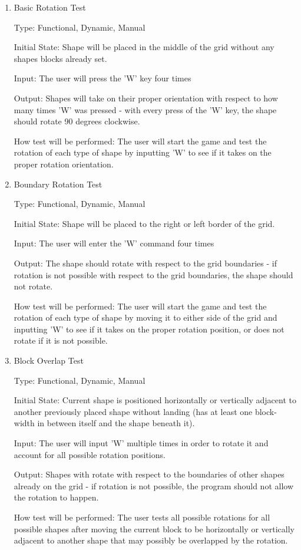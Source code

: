 \documentclass[12pt, titlepage]{article}
\begin{document}
\begin{enumerate}

\item{Basic Rotation Test\\}

Type: Functional, Dynamic, Manual
					
Initial State: Shape will be placed in the middle of the grid without any shapes blocks already set. 
					
Input: The user will press the 'W' key four times
					
Output: Shapes will take on their proper orientation with respect to how many times 'W' was pressed - with every press of the 'W' key, the shape should rotate 90 degrees clockwise.
					
How test will be performed: The user will start the game and test the rotation of each type of shape by inputting 'W' to see if it takes on the proper rotation orientation.
                    
\item{Boundary Rotation Test\\}

Type: Functional, Dynamic, Manual
					
Initial State: Shape will be placed to the right or left border of the grid. 
					
Input: The user will enter the 'W' command four times
					
Output: The shape should rotate with respect to the grid boundaries - if rotation is not possible with respect to the grid boundaries, the shape should not rotate.
					
How test will be performed: The user will start the game and test the rotation of each type of shape by moving it to either side of the grid and inputting 'W' to see if it takes on the proper rotation position, or does not rotate if it is not possible.
					
\item{Block Overlap Test\\}

Type: Functional, Dynamic, Manual
					
Initial State: Current shape is positioned horizontally or vertically adjacent to another previously placed shape without landing (has at least one block-width in between itself and the shape beneath it).
					
Input: The user will input 'W' multiple times in order to rotate it and account for all possible rotation positions.

Output: Shapes with rotate with respect to the boundaries of other shapes already on the grid - if rotation is not possible, the program should not allow the rotation to happen.
					
How test will be performed: The user tests all possible rotations for all possible shapes after moving the current block to be horizontally or vertically adjacent to another shape that may possibly be overlapped by the rotation.

\end{enumerate}
\end{document}
